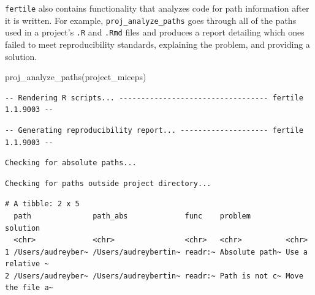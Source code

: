 \documentclass[12pt,twoside]{reedthesis}
\newenvironment{Shaded}{\begin{snugshade}}{\end{snugshade}}
\newcommand{\FunctionTok}[1]{\textcolor[rgb]{0.00,0.00,0.00}{#1}}
\newcommand{\NormalTok}[1]{#1}
\newcommand{\StringTok}[1]{\textcolor[rgb]{0.31,0.60,0.02}{#1}}
\begin{document}
\texttt{fertile} also contains functionality that analyzes code for path information after it is written. For example, \texttt{proj\_analyze\_paths} goes through all of the paths used in a project's \texttt{.R} and \texttt{.Rmd} files and produces a report detailing which ones failed to meet reproducibility standards, explaining the problem, and providing a solution.
\begin{Shaded}
\begin{Highlighting}[]
\FunctionTok{proj\_analyze\_paths}\NormalTok{(}\StringTok{\textquotesingle{}project\_miceps\textquotesingle{}}\NormalTok{)}
\end{Highlighting}
\end{Shaded}
\footnotesize
\begin{verbatim}
-- Rendering R scripts... ---------------------------------- fertile 1.1.9003 --
\end{verbatim}
\begin{verbatim}
-- Generating reproducibility report... -------------------- fertile 1.1.9003 --
\end{verbatim}
\begin{verbatim}
Checking for absolute paths...
\end{verbatim}
\begin{verbatim}
Checking for paths outside project directory...
\end{verbatim}
\begin{verbatim}
# A tibble: 2 x 5
  path              path_abs             func    problem        solution        
  <chr>             <chr>                <chr>   <chr>          <chr>           
1 /Users/audreyber~ /Users/audreybertin~ readr:~ Absolute path~ Use a relative ~
2 /Users/audreyber~ /Users/audreybertin~ readr:~ Path is not c~ Move the file a~
\end{verbatim}
\normalsize
\end{document}
